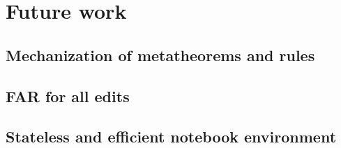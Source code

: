\section{Future work}
\label{sec:future_work}

\subsection{Mechanization of metatheorems and rules}
\label{sec:formalization}

\subsection{FAR for all edits}
\label{sec:far_all_edits}


\subsection{Stateless and efficient notebook environment}
\label{sec:notebook_ui_future}


